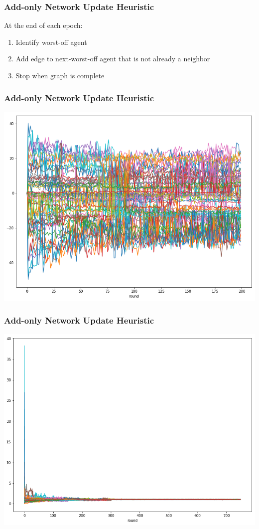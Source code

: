 \documentclass{beamer}
\begin{document}
\begin{frame}
  \frametitle{Add-only Network Update Heuristic}
  At the end of each epoch:
  \begin{enumerate}
  \item Identify worst-off agent
  \item Add edge to next-worst-off agent that is not already a neighbor
  \item Stop when graph is complete
  \end{enumerate}
\end{frame}

\begin{frame}
  \frametitle{Add-only Network Update Heuristic}
  \includegraphics[width=\textwidth]{h1startwealth.png}
\end{frame}

\begin{frame}
  \frametitle{Add-only Network Update Heuristic}
  \includegraphics[width=\textwidth]{h1prices.png}
\end{frame}
\end{document}
